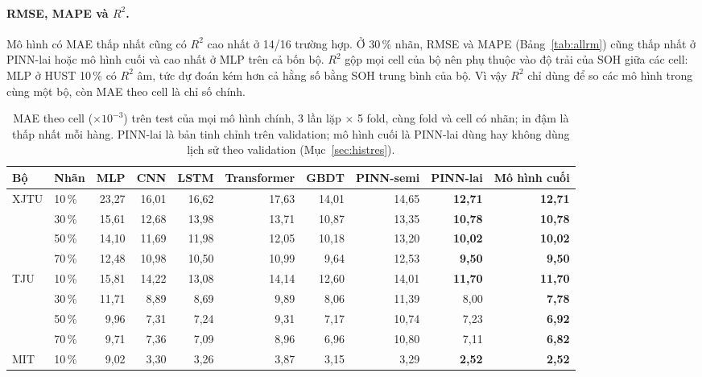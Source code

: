 \documentclass[12pt,a4paper,oneside]{report}
\theoremstyle{plain}
\theoremstyle{definition}
\begin{document}
\paragraph{RMSE, MAPE và $R^2$.} Mô hình có MAE thấp nhất cũng có $R^2$ cao nhất ở 14/16 trường hợp. Ở 30\,\% nhãn, RMSE và MAPE (Bảng~\ref{tab:allrm}) cũng thấp nhất ở PINN-lai hoặc mô hình cuối và cao nhất ở MLP trên cả bốn bộ.
$R^2$ gộp mọi cell của bộ nên phụ
thuộc vào độ trải của SOH giữa các cell: MLP ở HUST 10\,\% có $R^2$ âm, tức dự đoán kém hơn cả hằng số bằng SOH trung bình của bộ. Vì vậy $R^2$ chỉ dùng để so các mô hình trong cùng một bộ, còn MAE theo
cell là chỉ số chính.

\begin{table}[!htbp]\centering\footnotesize
\caption[MAE theo cell của mọi mô hình chính]{MAE theo cell ($\times10^{-3}$) trên test của mọi mô hình chính, 3 lần lặp $\times$ 5 fold, cùng fold và cell có nhãn; in đậm là thấp nhất mỗi hàng. PINN-lai là bản tinh chỉnh trên validation; mô hình cuối là PINN-lai dùng hay không dùng lịch sử theo validation (Mục~\ref{sec:histres}).}\label{tab:allmae}
\begin{adjustbox}{max width=\textwidth}\begin{tabular}{llrrrrrrrr}\toprule
Bộ & Nhãn & MLP & CNN & LSTM & Transformer & GBDT & PINN-semi & PINN-lai & Mô hình cuối \\\midrule
XJTU & 10\,\% & 23{,}27 & 16{,}01 & 16{,}62 & 17{,}63 & 14{,}01 & 14{,}65 & \textbf{12{,}71} & \textbf{12{,}71} \\
 & 30\,\% & 15{,}61 & 12{,}68 & 13{,}98 & 13{,}71 & 10{,}87 & 13{,}35 & \textbf{10{,}78} & \textbf{10{,}78} \\
 & 50\,\% & 14{,}10 & 11{,}69 & 11{,}98 & 12{,}05 & 10{,}18 & 13{,}20 & \textbf{10{,}02} & \textbf{10{,}02} \\
 & 70\,\% & 12{,}48 & 10{,}98 & 10{,}50 & 10{,}99 & 9{,}64 & 12{,}53 & \textbf{9{,}50} & \textbf{9{,}50} \\
TJU & 10\,\% & 15{,}81 & 14{,}22 & 13{,}08 & 14{,}14 & 12{,}60 & 14{,}01 & \textbf{11{,}70} & \textbf{11{,}70} \\
 & 30\,\% & 11{,}71 & 8{,}89 & 8{,}69 & 9{,}89 & 8{,}06 & 11{,}39 & 8{,}00 & \textbf{7{,}78} \\
 & 50\,\% & 9{,}96 & 7{,}31 & 7{,}24 & 9{,}31 & 7{,}17 & 10{,}74 & 7{,}23 & \textbf{6{,}92} \\
 & 70\,\% & 9{,}71 & 7{,}36 & 7{,}09 & 8{,}96 & 6{,}96 & 10{,}80 & 7{,}11 & \textbf{6{,}82} \\
MIT & 10\,\% & 9{,}02 & 3{,}30 & 3{,}26 & 3{,}87 & 3{,}15 & 3{,}29 & \textbf{2{,}52} & \textbf{2{,}52} \\

\end{tabular}
\end{adjustbox}
\end{table}
\end{document}
